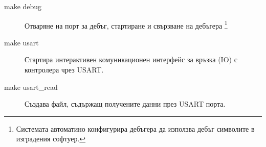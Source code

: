 \documentclass[handout]{beamer}
\begin{document}
\begin{frame}[t]
	\begin{block}{ }
	\begin{description}
		\pause
		\item[make debug] Отваряне на порт за дебъг, стартиране и свързване на дебъгера
		\footnote{Системата автоматино конфигурира дебъгера да използва дебъг символите в изградения софтуер.}

		\pause
		\item[make usart] Стартира интерактивен комуникационен интерфейс за връзка (IO) с контролера чрез USART.

		\pause
		\item[make usart\_read] Създава файл, съдържащ получените данни през USART порта.

	\end{description}
	\end{block}
\end{frame}
\end{document}
